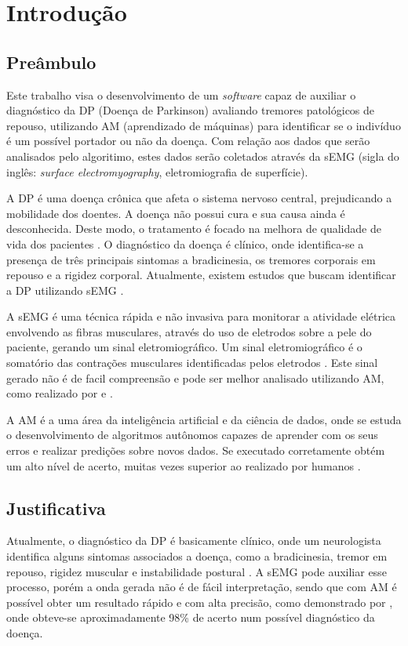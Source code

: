\chapter[Introdução]{Introdução} 
\section{Preâmbulo} 
Este trabalho visa o desenvolvimento de um \textit{software} capaz de auxiliar o diagnóstico da DP (Doença de Parkinson) avaliando tremores patológicos de repouso, utilizando AM (aprendizado de máquinas) para identificar se o indivíduo é um possível portador ou não da doença. Com relação aos dados que serão analisados pelo algoritimo, estes dados serão coletados através da sEMG (sigla do inglês: \textit{surface electromyography}, eletromiografia de superfície).

A DP é uma doença crônica que afeta o sistema nervoso central, prejudicando a mobilidade dos doentes. A doença não possui cura e sua causa ainda é desconhecida. Deste modo, o tratamento é focado na melhora de qualidade de vida dos pacientes \cite{da2016aspectos}. O diagnóstico da doença é clínico, onde identifica-se a presença de três principais sintomas a bradicinesia, os tremores corporais em repouso e a rigidez corporal. Atualmente, existem estudos que buscam identificar a DP utilizando sEMG \cite{eftaxias2015detection}.

A sEMG é uma técnica rápida e não invasiva para monitorar a atividade elétrica envolvendo as fibras musculares, através do uso de eletrodos sobre a pele do paciente, gerando um sinal eletromiográfico. Um sinal eletromiográfico é o somatório das contrações musculares identificadas pelos eletrodos \cite{de2010eletromiografia}. Este sinal gerado não é de facil compreensão e pode ser melhor analisado utilizando AM, como realizado por  e . 

A AM é a uma área da inteligência artificial e da ciência de dados, onde se estuda o desenvolvimento de algoritmos autônomos capazes de aprender com os seus erros e realizar predições sobre novos dados. Se executado corretamente obtém um alto nível de acerto, muitas vezes superior ao realizado por humanos \cite{Kohavi}.

\section{Justificativa} 
Atualmente, o diagnóstico da DP é basicamente clínico, onde um neurologista identifica alguns sintomas associados a doença, como a bradicinesia, tremor em repouso, rigidez muscular e instabilidade postural \cite{gago2014manual}. A sEMG pode auxiliar esse processo, porém a onda gerada não é de fácil interpretação, sendo que com AM é possível obter um resultado rápido e com alta precisão, como demonstrado por , onde obteve-se aproximadamente 98\% de acerto num possível diagnóstico da doença. 


